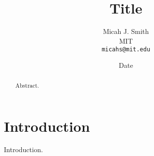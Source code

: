 \documentclass[conference,a4paper]{article}
\author{
    Micah J. Smith\\
    MIT\\
    \texttt{micahs@mit.edu}
}
\date{Date}
\title{Title}
\begin{document}
\maketitle

\begin{abstract}
    Abstract.
\end{abstract}

\section{Introduction}

Introduction.



\end{document}
